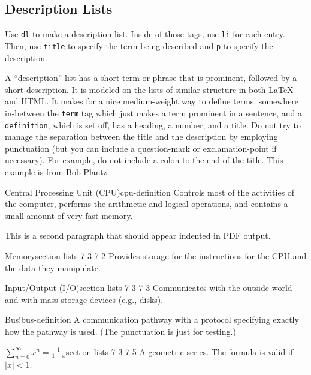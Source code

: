 \documentclass[pdflatex]{sn-jnl}
\theoremstyle{thmstyleone}%
\theoremstyle{thmstyletwo}%
\theoremstyle{thmstylethree}%
\newcommand{\mono}[1]{\texttt{#1}}
\numberwithin{equation}{section}
\begin{document}
%
%
%
\typeout{************************************************}
\typeout{************************************************}
%
\subsection{Description Lists}\label{section-lists-7}%
Use \mono{dl} to make a description list. Inside of those tags, use \mono{li} for each entry. Then, use \mono{title} to specify the term being described and \mono{p} to specify the description.%
\par
A ``description'' list  has a short term or phrase that is prominent, followed by a short description.  It is modeled on the lists of similar structure in both \LaTeX{} and HTML.  It makes for a nice medium-weight way to define terms, somewhere in-between the \mono{term} tag which just makes a term prominent in a sentence, and a \mono{definition}, which is set off, has a heading, a number, and a title.  Do not try to manage the separation between the title and the description by employing punctuation (but you can include a question-mark or exclamation-point if necessary).  For example, do not include a colon to the end of the title.  This example is from Bob Plantz.%
\begin{descriptionlist}
\begin{dlimedium}{Central Processing Unit (CPU)}{cpu-definition}%
Controls most of the activities of the computer, performs the arithmetic and logical operations, and contains a small amount of very fast memory.%
\par
This is a second paragraph that should appear indented in PDF output.%
\end{dlimedium}%
\begin{dlimedium}{Memory}{section-lists-7-3-7-2}%
Provides storage for the instructions for the CPU and the data they manipulate.%
\end{dlimedium}%
\begin{dlimedium}{Input\slash{}Output (I\slash{}O)}{section-lists-7-3-7-3}%
Communicates with the outside world and with mass storage devices (e.g.\@, disks).%
\end{dlimedium}%
\begin{dlimedium}{Bus!}{bus-definition}%
A communication pathway with a protocol specifying exactly how the pathway is used. (The punctuation is just for testing.)%
\end{dlimedium}%
\begin{dlimedium}{\(\displaystyle \sum_{n=0}^\infty x^n = \frac{1}{1-x}\)}{section-lists-7-3-7-5}%
A geometric series.  The formula is valid if \(|x| < 1\).%
\end{dlimedium}%
\end{descriptionlist}
\end{document}
